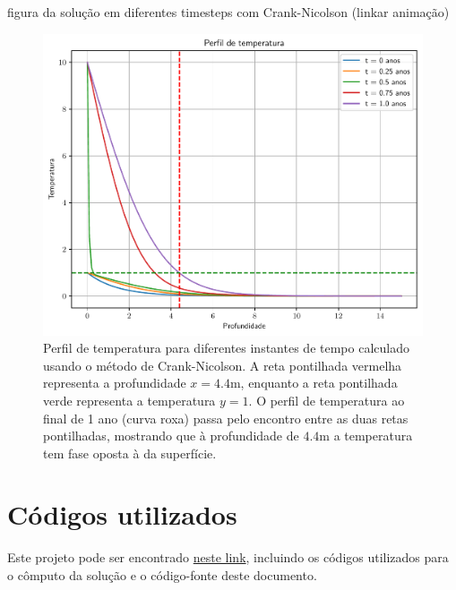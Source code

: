 \documentclass[twocolumn,showpacs,%
  nofootinbib,aps,superscriptaddress,%
  eqsecnum,prd,notitlepage,showkeys,10pt]{revtex4-1} %
\begin{document}
	figura da solução em diferentes timesteps com Crank-Nicolson (linkar animação)
	\begin{figure}[t]%
		\label{fig:crank-nicolson}
		\includegraphics[width=.5\textwidth]{Codes/crank-nicolson.pdf}
		\caption{Perfil de temperatura para diferentes instantes de tempo calculado usando
		o método de Crank-Nicolson. A reta pontilhada
		vermelha representa a profundidade $x = 4.4$m, enquanto a reta pontilhada verde
		representa a temperatura $y=1$. O perfil de temperatura ao final de 1 ano (curva roxa)
		passa pelo encontro entre as duas retas pontilhadas, mostrando que à profundidade
		de $4.4$m a temperatura tem fase oposta à da superfície.}
	\end{figure}





%
\section{Códigos utilizados}
%
	Este projeto pode ser encontrado
	\href{https://github.com/CaioTomas/Trabalho-IMCEDP}{neste link},
	incluindo os códigos utilizados para o cômputo da solução e o código-fonte
	deste documento.



\end{document}
